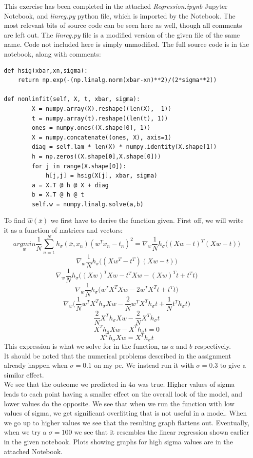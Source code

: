 This exercise has been completed in the attached \textit{Regression.ipynb} Jupyter Notebook, and \textit{linreg.py} python file, which is imported by the Notebook. The most relevant bits of source code can be seen here as well, though all comments are left out. The \textit{linreg.py} file is a modified version of the given file of the same name. Code not included here is simply unmodified. The full source code is in the notebook, along with comments:\\
\begin{verbatim}
def hsig(xbar,xn,sigma):
    return np.exp(-(np.linalg.norm(xbar-xn)**2)/(2*sigma**2))

def nonlinfit(self, X, t, xbar, sigma):
        X = numpy.array(X).reshape((len(X), -1))
        t = numpy.array(t).reshape((len(t), 1))
        ones = numpy.ones((X.shape[0], 1))
        X = numpy.concatenate((ones, X), axis=1)
        diag = self.lam * len(X) * numpy.identity(X.shape[1])
        h = np.zeros((X.shape[0],X.shape[0]))
        for j in range(X.shape[0]):
            h[j,j] = hsig(X[j], xbar, sigma)
        a = X.T @ h @ X + diag
        b = X.T @ h @ t
        self.w = numpy.linalg.solve(a,b)
\end{verbatim}
To find $\hat{w}(\bar{x})$ we first have to derive the function given. First off, we will write it as a function of matrices and vectors:
$$
\underset{w}{argmin} \frac{1}{N} \sum_{n=1}^N h_\sigma(\bar{x},x_n)(w^Tx_n-t_n)^2 = \nabla_w \frac{1}{N}h_\sigma\Big((Xw-t)^T (Xw-t)\Big)
$$
$$
\nabla_w \frac{1}{N}h_\sigma\Big((Xw^T-t^T) (Xw-t)\Big)
$$
$$
\nabla_w \frac{1}{N}h_\sigma\Big((Xw)^TXw-t^TXw-(Xw)^T t + t^Tt\Big)
$$
$$
\nabla_w \frac{1}{N}h_\sigma\Big(w^TX^TXw- 2w^TX^Tt + t^Tt\Big)
$$
$$
\nabla_w \Big(\frac{1}{N} w^TX^Th_\sigma Xw - \frac{2}{N} w^TX^Th_\sigma t + \frac{1}{N} t^Th_\sigma t\Big)
$$
$$
\frac{2}{N}X^Th_\sigma Xw - \frac{2}{N}X^Th_\sigma t
$$
$$
X^Th_\sigma Xw - X^Th_\sigma t = 0
$$
$$
X^Th_\sigma Xw = X^Th_\sigma t
$$
This expression is what we solve for in the function, as $a$ and $b$ respectively.\\
It should be noted that the numerical problems described in the assignment already happen when $\sigma = 0.1$ on my pc. We instead run it with $\sigma = 0.3$ to give a similar effect.\\
We see that the outcome we predicted in $4a$ was true. Higher values of sigma leads to each point having a smaller effect on the overall look of the model, and lower values do the opposite. We see that when we run the function with low values of sigma, we get significant overfitting that is not useful in a model. When we go up to higher values we see that the resulting graph flattens out. Eventually, when we try a $\sigma = 100$ we see that it resembles the linear regression shown earlier in the given notebook. Plots showing graphs for high sigma values are in the attached Notebook.\\
